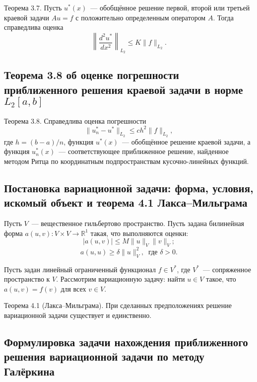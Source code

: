\documentclass[a4paper,14pt]{article} %
\begin{document}
Теорема 3.7. Пусть $u^*(x)$~--- обобщённое решение первой,
второй или третьей краевой задачи $Au = f$
с положительно определенным оператором $A$.
Тогда справедлива оценка
\begin{equation}
	\left\|
		\frac{d^2 u^*}{dx^2}
	\right\|_{L_2}
	\leq K \|f\|_{L_2}
	.
\end{equation}


\subsection{Теорема 3.8 об оценке погрешности приближенного решения краевой задачи в норме $L_2[a,b]$}

Теорема 3.8.
Справедлива оценка погрешности
\begin{equation}
	\|u^*_n - u^* \|_{L_2} \leq c h^2 \|f\|_{L_2}
	,
\end{equation}
где $h = (b - a)/n$, функция $u^* (x)$~--- обобщённое решение краевой задачи,
а функция $u^*_n (x)$~--- соответствующее приближенное решение,
найденное методом Ритца по координатным подпространствам кусочно-линейных функций.


\subsection{Постановка вариационной задачи: форма, условия, искомый объект и теорема 4.1 Лакса--Мильграма}

Пусть $V$~--- вещественное гильбертово пространство.
Пусть задана билинейная форма $a(u, v) : V \times V \to \mathbb{R}^1$ такая,
что выполняются оценки:
\begin{equation}
	|a(u, v)| \leq M \|u\|_V \|v\|_V
	;
\end{equation}
\begin{equation}
a(u, u) \geq \delta\|u\|^2_V ,
~
\mbox{~где~} \delta > 0
.
\end{equation}

Пусть задан линейный ограниченный функционал $f \in V^*$,
где $V^*$~--- сопряженное пространство к $V$.
Рассмотрим вариационную задачу:
найти $u \in V$ такое, что $a(u, v) = f (v)$ для всех $v \in V$.

Теорема 4.1 (Лакса--Мильграма).
При сделанных предположениях решение вариационной задачи существует и единственно.

\subsection{Формулировка задачи нахождения приближенного решения вариационной задачи по методу Галёркина}
\end{document}
